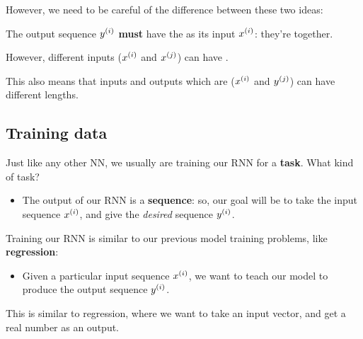         However, we need to be careful of the difference between these two ideas:\\

        \begin{clarification}
            The output sequence $y^{(i)}$ \textbf{must} have the  as its input $x^{(i)}$: they're  together.

            However, different inputs ($x^{(i)}$ and $x^{(j)}$) can have .

            \subsecdiv
            
            This also means that inputs and outputs which are  ($x^{(i)}$ and $y^{(j)}$) can have different lengths.
        \end{clarification}


    \pagebreak
    \subsection{Training data}

        Just like any other NN, we usually are training our RNN for a \textbf{task}. What kind of task?

        \begin{itemize}
            \item The output of our RNN is a \textbf{sequence}: so, our goal will be to take the input sequence $x^{(i)}$, and give the \textit{desired} sequence $y^{(i)}$.\\
        \end{itemize}

        \begin{concept}
            Training our RNN is similar to our previous model training problems, like \textbf{regression}:

            \begin{itemize}
                \item Given a particular input sequence $x^{(i)}$, we want to teach our model to produce the output sequence $y^{(i)}$.
            \end{itemize}

            This is similar to regression, where we want to take an input vector, and get a real number as an output.

        \end{concept}

